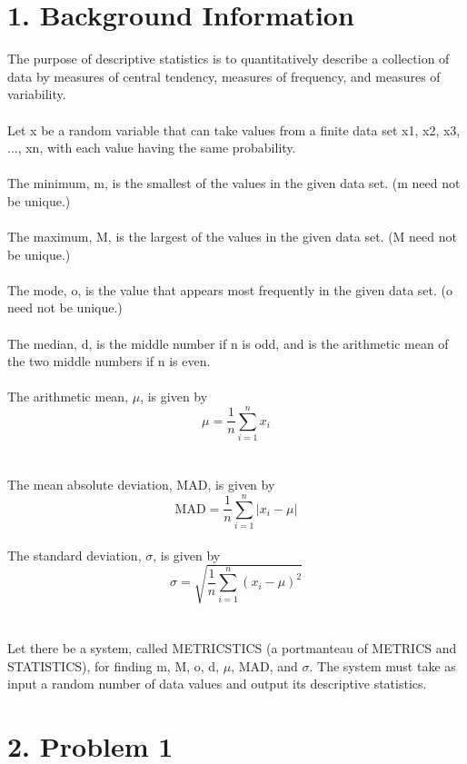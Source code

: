 \section{1. Background Information}
The purpose of descriptive statistics is to quantitatively describe a collection of data by measures of central tendency, measures of frequency, and measures of variability. \\
\\Let x be a random variable that can take values from a finite data set x1, x2, x3, ..., xn, with each value having the same probability. \\
\\The minimum, m, is the smallest of the values in the given data set. (m need not be unique.)\\
\\The maximum, M, is the largest of the values in the given data set. (M need not be unique.)\\
\\The mode, o, is the value that appears most frequently in the given data set. (o need not be unique.)\\
\\The median, d, is the middle number if n is odd, and is the arithmetic mean of the two middle numbers if n is even.\\
%
%
\\The arithmetic mean, $\mu$, is given by
\[ \mu = \frac{1}{n} \sum_{i=1}^{n} x_i \]\\
%
%
\\The mean absolute deviation, MAD, is given by
\[ \text{MAD} = \frac{1}{n} \sum_{i=1}^{n} |x_i - \mu| \]\\
%
%
The standard deviation, $\sigma$, is given by
\[ \sigma = \sqrt{\frac{1}{n}\sum_{i=1}^{n}(x_i - \mu)^2} \]\\
\\Let there be a system, called METRICSTICS (a portmanteau of METRICS and
STATISTICS), for finding m, M, o, d, $\mu$, MAD, and $\sigma$. The system must take as input a random number of data values and output its descriptive statistics. 

\vspace{50pt}
\section{ 2. Problem 1}
\vspace{10pt}
